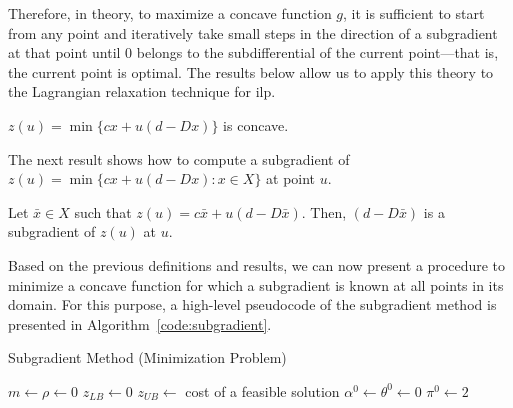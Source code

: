 Therefore, in theory, to maximize a concave function $g$, it is sufficient to
start from any point and iteratively take small steps in the direction of a
subgradient at that point until $0$ belongs to the subdifferential of the
current point—that is, the current point is optimal. The results below allow us
to apply this theory to the Lagrangian relaxation technique for \gls{ilp}.

\begin{proposition} \label{proposition-zu-convex}
	$z(u) = \min \{cx + u (d - Dx)\}$ is concave.
\end{proposition}

The next result shows how to compute a subgradient of $z(u) = \min \{cx + u (d -
	Dx) : x \in X\}$ at point $u$.

\begin{proposition}
	Let $\bar{x} \in X$ such that $z(u) = c \bar{x} + u(d - D\bar{x})$. Then, $(d - D\bar{x})$ is a subgradient of $z(u)$ at $u$.
\end{proposition}

Based on the previous definitions and results, we can now present a procedure to
minimize a concave function for which a subgradient is known at all points in
its domain. For this purpose, a high-level pseudocode of the subgradient method
is presented in Algorithm~\ref{code:subgradient}.

\begin{algorithm}[!ht]
	\caption{\label{code:subgradient} Subgradient Method (Minimization Problem)}
	$m \leftarrow \rho \leftarrow 0$\;
	$z_{LB} \leftarrow 0$\;
	$z_{UB} \leftarrow$ cost of a feasible solution\;
	$\alpha^{0} \leftarrow \theta^{0} \leftarrow 0$\; $\pi^{0} \leftarrow 2$\;
	
\end{algorithm}

